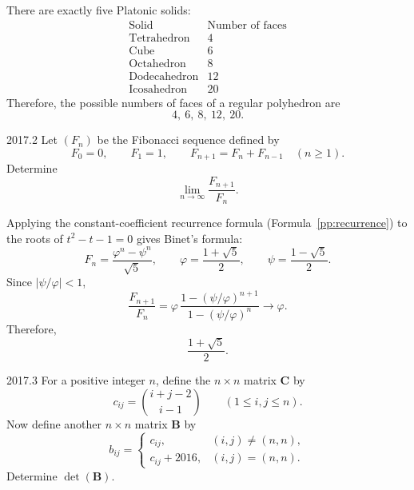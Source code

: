     \begin{solution}
        There are exactly five Platonic solids:
        \[
            \begin{array}{c|c}
                \text{Solid} & \text{Number of faces} \\
                \hline
                \text{Tetrahedron} & 4 \\
                \text{Cube} & 6 \\
                \text{Octahedron} & 8 \\
                \text{Dodecahedron} & 12 \\
                \text{Icosahedron} & 20
            \end{array}
        \]
        Therefore, the possible numbers of faces of a regular polyhedron are
        \[
            \boxed{4,\ 6,\ 8,\ 12,\ 20}.
        \]
    \end{solution}

    \begin{pastproblem}{2017.2}
        Let $(F_n)$ be the Fibonacci sequence defined by
        \[
            F_0=0,\qquad F_1=1,\qquad F_{n+1}=F_n+F_{n-1}\quad(n\geq1).
        \]
        Determine
        \[
            \lim\limits_{n\to\infty}\frac{F_{n+1}}{F_n}.
        \]
    \end{pastproblem}

    \begin{solution}
        Applying the constant-coefficient recurrence formula (Formula~\ref{pp:recurrence}) to the roots of $t^2-t-1=0$ gives Binet's formula:
        \[
            F_n=\frac{\varphi^n-\psi^n}{\sqrt5},
            \qquad
            \varphi=\frac{1+\sqrt5}{2},
            \qquad
            \psi=\frac{1-\sqrt5}{2}.
        \]
        Since $|\psi/\varphi|<1$,
        \[
            \frac{F_{n+1}}{F_n}
            =
            \varphi\,
            \frac{1-(\psi/\varphi)^{n+1}}
                 {1-(\psi/\varphi)^n}
            \longrightarrow
            \varphi.
        \]
        Therefore,
        \[
            \boxed{\frac{1+\sqrt5}{2}}.
        \]
    \end{solution}

    \begin{pastproblem}{2017.3}
        For a positive integer $n$, define the $n\times n$ matrix $\mathbf{C}$ by
        \[
            c_{ij}
            =
            \binom{i+j-2}{i-1}
            \qquad
            (1\leq i,j\leq n).
        \]
        Now define another $n\times n$ matrix $\mathbf{B}$ by
        \[
            b_{ij}
            =
            \begin{cases}
                c_{ij}, & (i,j)\neq (n,n), \\
                c_{ij}+2016, & (i,j)=(n,n).
            \end{cases}
        \]
        Determine $\det(\mathbf{B})$.
    \end{pastproblem}

